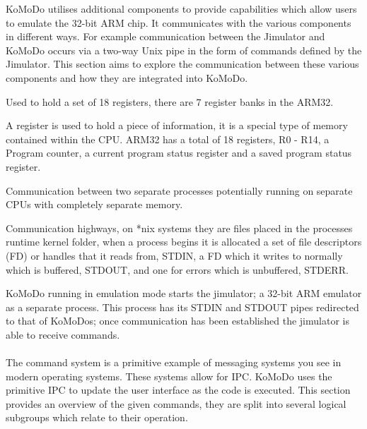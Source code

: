 KoMoDo utilises additional components to provide capabilities which allow users to emulate the 32-bit ARM chip. It communicates with the various components in different ways. For example communication between the Jimulator and KoMoDo occurs via a two-way Unix pipe in the form of commands defined by the Jimulator. This section aims to explore the communication between these various components and how they are integrated into KoMoDo. 

  \begin{description}[leftmargin=!,labelwidth=\widthof{\bfseries \footnotesize inter process communication}]
    \item[\footnotesize Register bank] Used to hold a set of 18 registers, there are 7 register banks in the ARM32.
    \item[\footnotesize Register] A register is used to hold a piece of information, it is a special type of memory contained within the CPU. ARM32 has a total of 18 registers, R0 - R14, a Program counter, a current program status register and a saved program status register.
    \item[\footnotesize Inter process communication] Communication between two separate processes potentially running on separate CPUs with completely separate memory.
    \item[\footnotesize (*nix) pipes] Communication highways, on *nix systems they are files placed in the processes runtime kernel folder, when a process begins it is allocated a set of file descriptors (FD) or handles that it reads from, STDIN, a FD which it writes to normally which is buffered, STDOUT, and one for errors which is unbuffered, STDERR.
  \end{description}
%
KoMoDo running in emulation mode starts the jimulator; a 32-bit ARM emulator as a separate process. This process has its STDIN and STDOUT pipes redirected to that of KoMoDos; once communication has been established the jimulator is able to receive commands.\\\\
%
The command system is a primitive example of messaging systems you see in modern operating systems. These systems allow for IPC. KoMoDo uses the primitive IPC to update the user interface as the code is executed. This section provides an overview of the given commands, they are split into several logical subgroups which relate to their operation.
%
